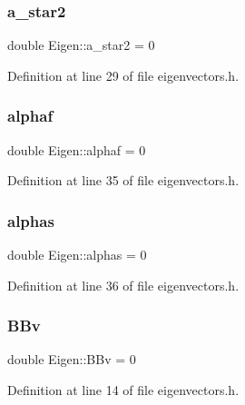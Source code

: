 \subsubsection{\texorpdfstring{a\+\_\+star2}{a\_star2}}
{\footnotesize\ttfamily double Eigen\+::a\+\_\+star2 = 0\hspace{0.3cm}{\ttfamily [private]}}



Definition at line 29 of file eigenvectors.\+h.

\mbox{\label{classEigen_aed80a042db0d0ced7b3da35981b2013d}} 
\subsubsection{\texorpdfstring{alphaf}{alphaf}}
{\footnotesize\ttfamily double Eigen\+::alphaf = 0\hspace{0.3cm}{\ttfamily [private]}}



Definition at line 35 of file eigenvectors.\+h.

\mbox{\label{classEigen_a8836310ec9c85daa434ff65f1c711120}} 
\subsubsection{\texorpdfstring{alphas}{alphas}}
{\footnotesize\ttfamily double Eigen\+::alphas = 0\hspace{0.3cm}{\ttfamily [private]}}



Definition at line 36 of file eigenvectors.\+h.

\mbox{\label{classEigen_ae770fea27b6a30250c5f43b89c0724b8}} 
\subsubsection{\texorpdfstring{B\+Bv}{BBv}}
{\footnotesize\ttfamily double Eigen\+::\+B\+Bv = 0\hspace{0.3cm}{\ttfamily [private]}}



Definition at line 14 of file eigenvectors.\+h.

